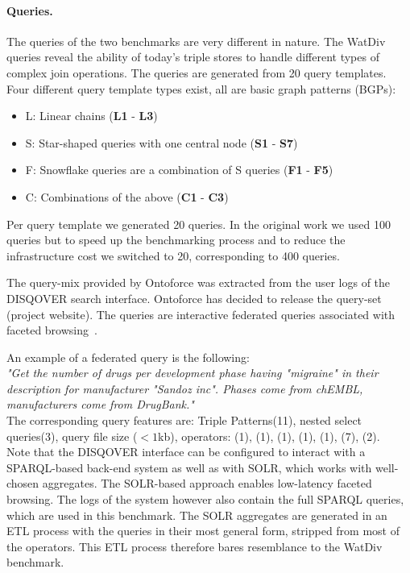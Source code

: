 \paragraph{Queries.} 
The queries of the two benchmarks are very different in nature. 
The WatDiv queries reveal the ability of today's triple stores to handle different types of complex join operations.
The queries are generated from 20 query templates. Four different query template types exist, all are basic graph patterns (BGPs): 
\begin{itemize}
	\item L: Linear chains (\textbf{L1} - \textbf{L3})
	\item S: Star-shaped queries with one central node (\textbf{S1} - \textbf{S7})
	\item F: Snowflake queries are a combination of S queries (\textbf{F1} - \textbf{F5})
	\item C: Combinations of the above (\textbf{C1} - \textbf{C3})
\end{itemize}
Per query template we generated 20 queries. In the original work we used 100 queries but to speed up the benchmarking process and to reduce the infrastructure cost we switched to 20, corresponding to 400 queries.

The query-mix provided by Ontoforce was extracted from the user logs of the DISQOVER search interface. Ontoforce has decided to release the query-set (project website).
The queries are interactive federated queries associated with faceted browsing~\cite{Ferre, Oren}.

An example of a federated query is the following: \\

\textit{"Get the number of drugs per development phase having "migraine"
in their description for manufacturer "Sandoz inc". Phases come
from chEMBL, manufacturers come from DrugBank."} \\

The corresponding query features are: Triple Patterns(11), nested select queries(3), query file size ($<1$kb), operators: (1), (1), (1), (1), (1), (7), (2).  \\

Note that the DISQOVER interface can be configured to interact with a SPARQL-based back-end system as well as with SOLR, which works with well-chosen aggregates. The SOLR-based approach enables low-latency faceted browsing. The logs of the system however also contain the full SPARQL queries, which are used in this benchmark. 
The SOLR aggregates are generated in an ETL process with the queries in their most general form, stripped from most of the operators. This ETL process therefore bares resemblance to the WatDiv benchmark.

